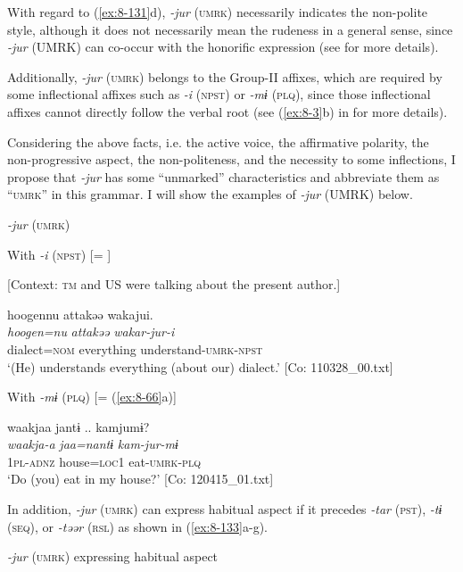 With regard to (\ref{ex:8-131}d), \textit{-jur} (\textsc{umrk}) necessarily indicates the non-polite style, although it does not necessarily mean the rudeness in a general sense, since \textit{-jur} (UMRK) can co-occur with the honorific expression (see  for more details).

Additionally, \textit{-jur} (\textsc{umrk}) belongs to the Group-II affixes, which are required by some inflectional affixes such as \textit{-i} (\textsc{npst}) or \textit{-mɨ} (\textsc{plq}), since those inflectional affixes cannot directly follow the verbal root (see (\ref{ex:8-3}b) in  for more details).

  Considering the above facts, i.e. the active voice, the affirmative polarity, the non-progressive aspect, the non-politeness, and the necessity to some inflections, I propose that \textit{-jur} has some “unmarked” characteristics and abbreviate them as “\textsc{umrk}” in this grammar. I will show the examples of \textit{-jur} (UMRK) below.

\ea\label{ex:8-132}
  \textit{-jur} (\textsc{umrk})

\ea With \textit{-i} (\textsc{npst}) [= ]

  [Context: \textsc{tm} and US were talking about the present author.]

  {\TM}
\glll  {\textbar}hoogen{\textbar}nu  attakəə  wakajui.\\
\textit{hoogen=nu}  \textit{attakəə}  \textit{wakar-jur-i}\\
    dialect=\textsc{nom}  everything  understand-\textsc{umrk}-\textsc{npst}\\
\glt ‘(He) understands everything (about our) dialect.’ [Co: 110328\_00.txt]


\ex With \textit{-mɨ} (\textsc{plq}) [= (\ref{ex:8-66}a)]

  {\TM}
\glll  waakjaa  jantɨ ..  kamjumɨ?\\
\textit{waakja-a}  \textit{jaa=nantɨ}  \textit{kam-jur-mɨ}\\
    1\textsc{pl}-\textsc{adnz}  house=\textsc{loc1}  eat-\textsc{umrk}-\textsc{plq}\\
\glt ‘Do (you) eat in my house?’ [Co: 120415\_01.txt]
\z
\z

  In addition, \textit{-jur} (\textsc{umrk}) can express habitual aspect if it precedes \textit{-tar} (\textsc{pst}), \textit{-tɨ} (\textsc{seq}), or \textit{-təər} (\textsc{rsl}) as shown in (\ref{ex:8-133}a-g).

\ea\label{ex:8-133}
  \textit{-jur} (\textsc{umrk}) expressing habitual aspect

